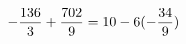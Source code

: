 \documentclass[preview]{standalone}
\begin{document}
\begin{align*}
\special{dvisvgm:raw <g id='unique000'>}- \frac{136}{3} + \frac{702}{9} = 10 - 6 (- \frac{34}{9})\special{dvisvgm:raw </g>}
\end{align*}
\end{document}
